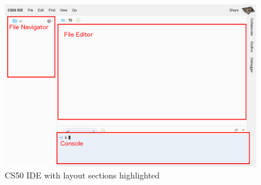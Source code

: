 \documentclass[12pt]{scrartcl}
\begin{document}
\begin{figure}[h]
\centering
\includegraphics[scale=0.35]{img/cs50-highlighted}
\caption{CS50 IDE with layout sections highlighted}
\label{fig:cs50idehighlighted}
\end{figure}
\end{document}
